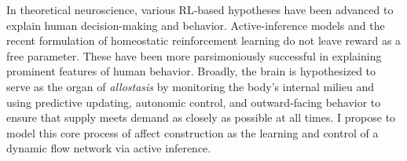 \begin{singlespace}
\im
In theoretical neuroscience, various RL-based hypotheses have been advanced
to explain human decision-making and behavior.  Active-inference models and
the recent formulation of homeostatic reinforcement learning do not leave
reward as a free parameter\cite{Keratmati2014,Pezzulo2018,Morville2018a}.
These have been more parsimoniously successful in explaining prominent
features of human behavior.  Broadly, the brain is hypothesized to serve
as the organ of \emph{allostasis} by monitoring the body's internal milieu
and using predictive updating, autonomic control, and outward-facing
behavior to ensure that supply meets demand as closely as possible at all
times\cite{Barrett2015,BarrettTheoryOfConstructed2017,Kleckner2017}. I
propose to model this core process of affect construction as the learning
and control of a dynamic flow network via active inference.
\end{singlespace}
